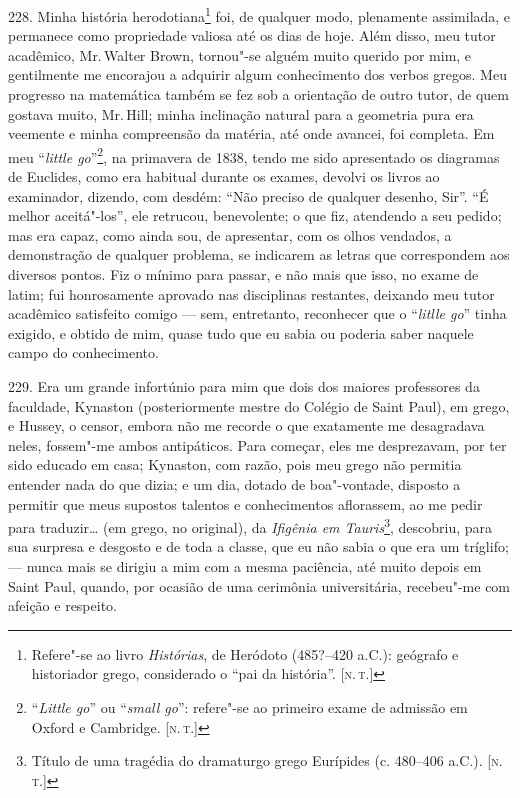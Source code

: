 228. Minha história herodotiana\footnote{Refere"-se ao livro
  \emph{Histórias}, de Heródoto (485?--420 a.C.): geógrafo e historiador
  grego, considerado o ``pai da história''. {[}\textsc{n.\,t.}{]}} foi, de
qualquer modo, plenamente assimilada, e permanece como propriedade
valiosa até os dias de hoje. Além disso, meu tutor acadêmico, Mr.\,Walter
Brown, tornou"-se alguém muito querido por mim, e gentilmente me
encorajou a adquirir algum conhecimento dos verbos gregos. Meu progresso
na matemática também se fez sob a orientação de outro tutor, de quem
gostava muito, Mr.\,Hill; minha inclinação natural para a geometria pura
era veemente e minha compreensão da matéria, até onde avancei, foi
completa. Em meu ``\emph{little go}''\footnote{``\emph{Little go}'' ou
  ``\emph{small go}'': refere"-se ao primeiro exame de admissão em Oxford
  e Cambridge. {[}\textsc{n.\,t.}{]}}, na primavera de 1838, tendo me sido
apresentado os diagramas de Euclides, como era habitual durante os
exames, devolvi os livros ao examinador, dizendo, com desdém: ``Não
preciso de qualquer desenho, Sir''. ``É melhor aceitá"-los'', ele
retrucou, benevolente; o que fiz, atendendo a seu pedido; mas era capaz,
como ainda sou, de apresentar, com os olhos vendados, a demonstração de
qualquer problema, se indicarem as letras que correspondem aos diversos
pontos. Fiz o mínimo para passar, e não mais que isso, no exame de
latim; fui honrosamente aprovado nas disciplinas restantes, deixando meu
tutor acadêmico satisfeito comigo --- sem, entretanto, reconhecer que o
``\emph{litlle go}'' tinha exigido, e obtido de mim, quase tudo que eu
sabia ou poderia saber naquele campo do conhecimento.

229. Era um grande infortúnio para mim que dois dos maiores professores
da faculdade, Kynaston (posteriormente mestre do Colégio de Saint Paul),
em grego, e Hussey, o censor, embora não me recorde o que exatamente me
desagradava neles, fossem"-me ambos antipáticos. Para começar, eles me
desprezavam, por ter sido educado em casa; Kynaston, com razão, pois meu
grego não permitia entender nada do que dizia; e um dia, dotado de
boa"-vontade, disposto a permitir que meus supostos talentos e
conhecimentos aflorassem, ao me pedir para traduzir\ldots{} (em grego, no
original), da \emph{Ifigênia em Tauris}\footnote{Título de uma tragédia
  do dramaturgo grego Eurípides (c. 480--406 a.C.). {[}\textsc{n.\,t.}{]}}, descobriu, para sua surpresa e desgosto e de toda a classe,
que eu não sabia o que era um tríglifo; --- nunca mais se dirigiu a mim
com a mesma paciência, até muito depois em Saint Paul, quando, por
ocasião de uma cerimônia universitária, recebeu"-me com afeição e
respeito.

